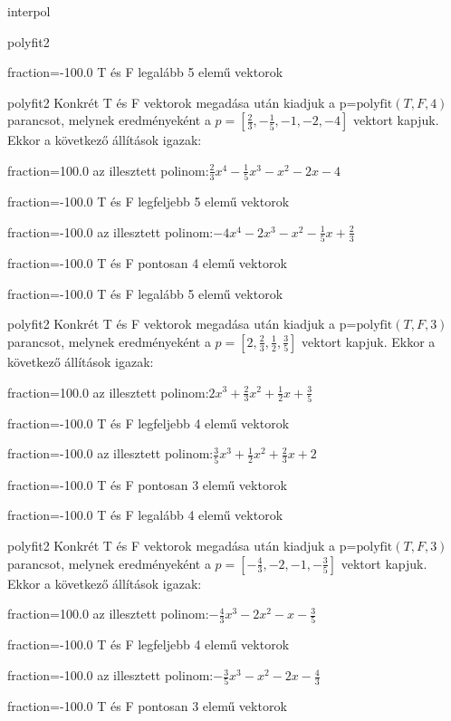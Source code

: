 \documentclass[12pt]{article}
\begin{document}
\begin{quiz}{interpol}
\begin{multi}[multiple]{polyfit2}
\item[fraction=-100.0] T és F legalább 5 elemű vektorok
\end{multi}
\begin{multi}[multiple]{polyfit2}
Konkrét T és F vektorok megadása után kiadjuk a p=$\mathrm{polyfit}(T,F,4)$
parancsot, melynek eredményeként a $p=\left[\frac{2}{3},-\frac{1}{5},-1,-2,-4\right]$ vektort kapjuk.
Ekkor a következő állítások igazak:
\item[fraction=100.0] az illesztett polinom:$\frac{2}{3}x^4-\frac{1}{5}x^3-x^2-2x-4$
\item[fraction=-100.0]  T és F legfeljebb 5 elemű vektorok
\item[fraction=-100.0]  az illesztett polinom:$-4x^4-2x^3-x^2-\frac{1}{5}x+\frac{2}{3}$
\item[fraction=-100.0]  T és F pontosan 4 elemű vektorok
\item[fraction=-100.0] T és F legalább 5 elemű vektorok
\end{multi}
\begin{multi}[multiple]{polyfit2}
Konkrét T és F vektorok megadása után kiadjuk a p=$\mathrm{polyfit}(T,F,3)$
parancsot, melynek eredményeként a $p=\left[2,\frac{2}{3},\frac{1}{2},\frac{3}{5}\right]$ vektort kapjuk.
Ekkor a következő állítások igazak:
\item[fraction=100.0] az illesztett polinom:$2x^3+\frac{2}{3}x^2+\frac{1}{2}x+\frac{3}{5}$
\item[fraction=-100.0]  T és F legfeljebb 4 elemű vektorok
\item[fraction=-100.0]  az illesztett polinom:$\frac{3}{5}x^3+\frac{1}{2}x^2+\frac{2}{3}x+2$
\item[fraction=-100.0]  T és F pontosan 3 elemű vektorok
\item[fraction=-100.0] T és F legalább 4 elemű vektorok
\end{multi}
\begin{multi}[multiple]{polyfit2}
Konkrét T és F vektorok megadása után kiadjuk a p=$\mathrm{polyfit}(T,F,3)$
parancsot, melynek eredményeként a $p=\left[-\frac{4}{3},-2,-1,-\frac{3}{5}\right]$ vektort kapjuk.
Ekkor a következő állítások igazak:
\item[fraction=100.0] az illesztett polinom:$-\frac{4}{3}x^3-2x^2-x-\frac{3}{5}$
\item[fraction=-100.0]  T és F legfeljebb 4 elemű vektorok
\item[fraction=-100.0]  az illesztett polinom:$-\frac{3}{5}x^3-x^2-2x-\frac{4}{3}$
\item[fraction=-100.0]  T és F pontosan 3 elemű vektorok

\end{multi}
\end{quiz}
\end{document}
